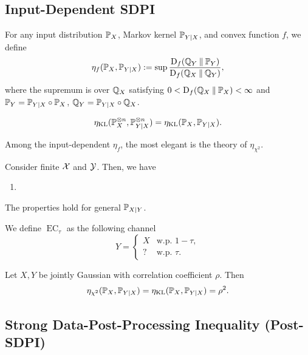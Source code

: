 \subsection{Input-Dependent SDPI}
\begin{definition}
    For any input distribution $\mathbb{P}_X$, Markov kernel $\mathbb{P}_{Y|X}$, and convex function $f$, we define 
    \[\eta_f(\mathbb{P}_X,\mathbb{P}_{Y|X}):=\sup \frac{\operatorname{D}_f(\mathbb{Q}_Y\mathbin{\|}\mathbb{P}_Y)}{\operatorname{D}_f(\mathbb{Q}_X\mathbin{\|}\mathbb{Q}_Y)},\]
    where the supremum is over $\mathbb{Q}_X$ satisfying $0<\operatorname{D}_f(\mathbb{Q}_X\mathbin{\|}\mathbb{P}_X)<\infty$ and
    $\mathbb{P}_Y=\mathbb{P}_{Y|X}\circ \mathbb{P}_X$, $\mathbb{Q}_Y=\mathbb{P}_{Y|X}\circ\mathbb{Q}_X$.
\end{definition}

\begin{proposition}
    \[\eta_{\operatorname{KL}}(\mathbb{P}_X^{\otimes n},\mathbb{P}_{Y|X}^{\otimes n})=\eta_{\operatorname{KL}}(\mathbb{P}_X,\mathbb{P}_{Y|X}).\]
\end{proposition}

Among the input-dependent $\eta_f$, the most elegant is the theory of $\eta_{\chi^2}$.

\begin{theorem}
    Consider finite $\mathcal{X}$ and $\mathcal{Y}$. Then, we have
    \begin{enumerate}[]
        \item 
    \end{enumerate}
\end{theorem}
The properties hold for general $\mathbb{P}_{X|Y}$.

\begin{example}
    We define $\operatorname{EC}_\tau$ as the following channel
    \[Y=\begin{cases}
        X &\text{w.p. } 1-\tau,\\
        ? &\text{w.p. }\tau.
    \end{cases}\]
\end{example}

\begin{example}
    Let $X,Y$ be jointly Gaussian with correlation coefficient $\rho$. Then
    \[\eta_{\chi^2}(\mathbb{P}_X,\mathbb{P}_{Y|X})=\eta_{\operatorname{KL}}(\mathbb{P}_X,\mathbb{P}_{Y|X})=\rho^2.\]
\end{example}

\begin{example}
    
\end{example}

\subsection{Strong Data-Post-Processing Inequality (Post-SDPI)}

